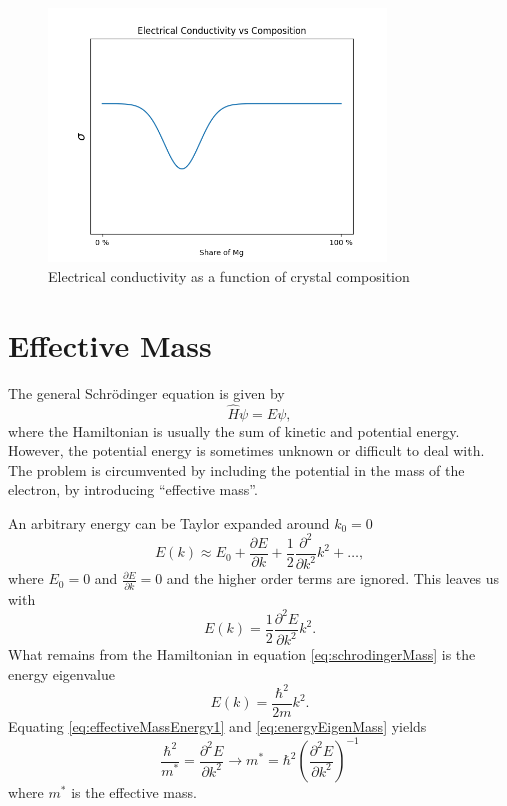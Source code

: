 \documentclass[11pt]{amsart}
\begin{document}
\begin{figure}
\centering
	\includegraphics[width=0.8\textwidth]{NaMg.png}
	\caption{Electrical conductivity as a function of crystal composition}
	\label{fig:NaMg}
\end{figure}

\section{Effective Mass}
The general Schrödinger equation is given by
\begin{equation}
\label{eq:schrodingerMass}
\hat{H}\psi = E\psi,
\end{equation}
where the Hamiltonian is usually the sum of kinetic and potential energy. However, the potential energy is sometimes unknown or difficult to deal with. The problem is circumvented by including the potential in the mass of the electron, by introducing ``effective mass''.

An arbitrary energy can be Taylor expanded around $k_0=0$
\begin{equation}
E(k) \approx E_0 + \frac{\partial E}{\partial k} + \frac{1}{2}\frac{\partial^2}{\partial k^2} k^2 + \dots,
\end{equation}
where $E_0=0$ and $\frac{\partial E}{\partial k} = 0$ and the higher order terms are ignored. This leaves us with
\begin{equation}
\label{eq:effectiveMassEnergy1}
E(k) = \frac{1}{2}\frac{\partial^2 E}{\partial k^2}k^2.
\end{equation}
What remains from the Hamiltonian in equation \ref{eq:schrodingerMass} is the energy eigenvalue
\begin{equation}
\label{eq:energyEigenMass}
E(k) = \frac{\hbar^2}{2m}k^2.
\end{equation}
Equating \ref{eq:effectiveMassEnergy1} and \ref{eq:energyEigenMass} yields
\begin{equation}
\frac{\hbar^2}{m^*} = \frac{\partial^2 E}{\partial k^2}
\to
m^* = \hbar^2\left(\frac{\partial^2 E}{\partial k^2}\right)^{-1}   
\end{equation}
where $m^*$ is the effective mass.
\end{document}

